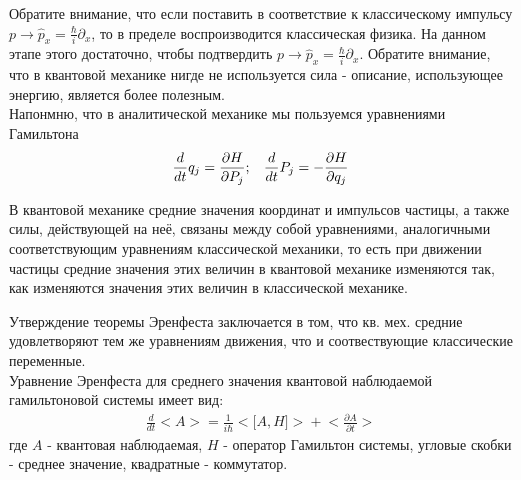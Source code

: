 ﻿\documentclass[__main__.tex]{subfiles}
\begin{document}
Обратите внимание, что если поставить в соответствие к классическому импульсу $p \rightarrow \widehat{p}_x = \frac{\hbar}{i}\partial_x$, то в пределе воспроизводится классическая физика. На данном этапе этого достаточно, чтобы подтвердить $p \rightarrow \widehat{p}_x = \frac{\hbar}{i}\partial_x$. Обратите внимание, что в квантовой механике нигде не используется сила - описание, использующее энергию, является более полезным.\\
Напонмню, что в аналитической механике мы пользуемся уравнениями Гамильтона
\begin{gather*}
\frac{d}{dt}q_j = \frac{\partial{H}}{\partial{P_j}}; \hspace{3mm} \frac{d}{dt}P_j = -\frac{\partial{H}}{\partial{q_j}}
\end{gather*}
\begin{theorem}
	В квантовой механике средние значения координат и импульсов частицы, а также силы, действующей на неё, связаны между собой уравнениями, аналогичными соответствующим уравнениям классической механики, то есть при движении частицы средние значения этих величин в квантовой механике изменяются так, как изменяются значения этих величин в классической механике.
\end{theorem}
Утверждение теоремы Эренфеста заключается в том, что кв. мех. средние удовлетворяют тем же уравнениям движения, что и соотвествующие классические переменные.\\
Уравнение Эренфеста для среднего значения квантовой наблюдаемой гамильтоновой системы имеет вид:\\
\begin{gather*}
\frac{d}{dt}\big<A\big> = \frac{1}{i\hbar}\big<\big[A,H\big]\big> + \bigg<\frac{\partial{A}}{\partial{t}}\bigg>
\end{gather*}
где $A$ - квантовая наблюдаемая, $H$ - оператор Гамильтон системы, угловые скобки - среднее значение, квадратные - коммутатор.
\end{document}

